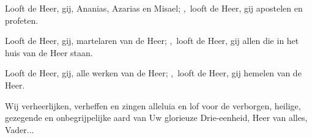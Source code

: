 \documentclass[12pt,twoside,a5paper]{article}
\begin{document}
\begin{halfparskip}
  Looft de Heer, gij, Ananias, Azarias en Misael; \sep~looft de Heer, gij apostelen en profeten.

  Looft de Heer, gij, martelaren van de Heer; \sep~looft de Heer, gij allen die in het huis van de Heer staan.

   Looft de Heer, gij, alle werken van de Heer; \sep~looft de Heer, gij hemelen van de Heer. 
\end{halfparskip}

\begin{halfparskip}
   Wij verheerlijken, verheffen en zingen alleluia en lof voor de verborgen, heilige,
  gezegende en onbegrijpelijke aard van Uw glorieuze Drie-eenheid, Heer van alles, Vader...
\end{halfparskip}
\end{document}

